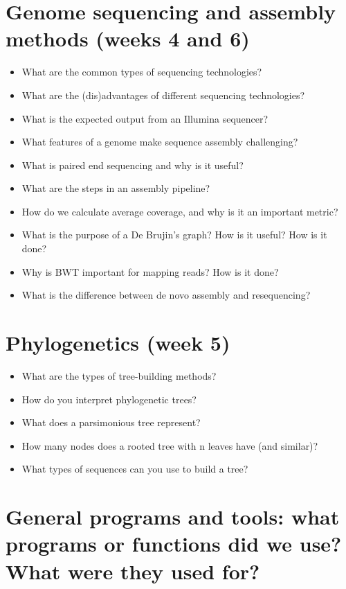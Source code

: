 \documentclass{article}
\begin{document}
\section{Genome sequencing and assembly methods (weeks 4 and 6)}
\begin{itemize}
    \item What are the common types of sequencing technologies?
    \item What are the (dis)advantages of different sequencing technologies?
    \item What is the expected output from an Illumina sequencer?
    \item What features of a genome make sequence assembly challenging?
    \item What is paired end sequencing and why is it useful?
    \item What are the steps in an assembly pipeline?
    \item How do we calculate average coverage, and why is it an important metric?
    \item What is the purpose of a De Brujin’s graph? How is it useful? How is it done?
    \item Why is BWT important for mapping reads? How is it done?
    \item What is the difference between de novo assembly and resequencing?
\end{itemize}

\section{Phylogenetics (week 5)}
\begin{itemize}
    \item What are the types of tree-building methods?
    \item How do you interpret phylogenetic trees?
    \item What does a parsimonious tree represent?
    \item How many nodes does a rooted tree with n leaves have (and similar)?
    \item What types of sequences can you use to build a tree?
\end{itemize}

\section{General programs and tools: what programs or functions did we use? What were they used for?}
\end{document}
